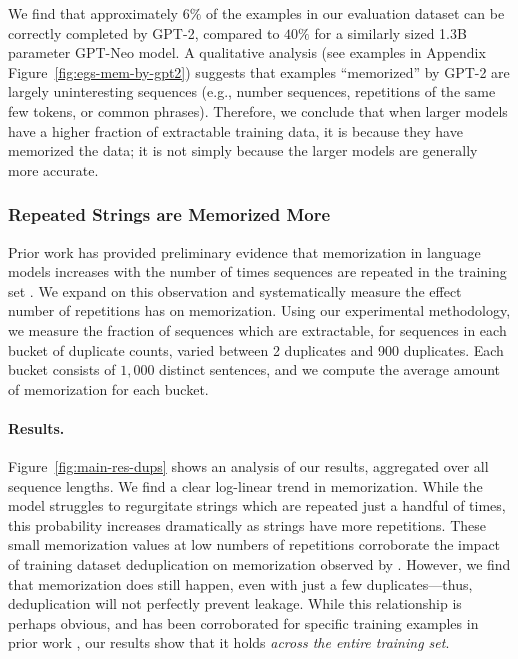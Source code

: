 We find that approximately $6\%$ of the examples in our evaluation dataset can be correctly 
completed by GPT-2, compared to $40\%$ for a similarly sized 1.3B parameter GPT-Neo model. 
A qualitative analysis (see examples in Appendix Figure~\ref{fig:egs-mem-by-gpt2}) suggests that examples ``memorized'' by GPT-2 are largely uninteresting
sequences (e.g., number sequences, repetitions of the same few tokens, or common phrases).
%
Therefore, we conclude that when larger models have a higher fraction of extractable training data,
it is because they have memorized the data; it is not simply because the larger models are generally more accurate.


\subsubsection{Repeated Strings are Memorized More}
\label{sec:duplicates}
Prior work has provided preliminary evidence that memorization in language models increases with the number of times sequences are repeated in the training set \citep{carlini2020extracting, lee2021deduplicating}.
%
We expand on this observation and systematically measure the effect number of repetitions has on memorization.
%
Using our experimental methodology, we measure the fraction of sequences which are extractable, for sequences in each bucket of duplicate counts, varied between 2 duplicates and 900 duplicates.
Each bucket consists of $1{,}000$ distinct sentences, and we compute the average amount of memorization for each bucket.


\paragraph{Results.}
Figure~\ref{fig:main-res-dups} shows an analysis of our results, aggregated over all sequence lengths.
We find a clear log-linear trend in memorization. While the model struggles to regurgitate strings which are repeated just a handful of times, this probability increases dramatically as strings have more repetitions.
%
These small memorization values at low numbers of repetitions corroborate the impact of training dataset deduplication on memorization observed by \citet{lee2021deduplicating}.
%
However, we find that memorization does still happen, even with just a few duplicates---thus, deduplication will not perfectly prevent leakage.
%
While this relationship is perhaps obvious, and has been corroborated for specific training examples in prior work \citep{carlini2019secret, carlini2020extracting}, our results show that it holds \emph{across the entire training set}.


